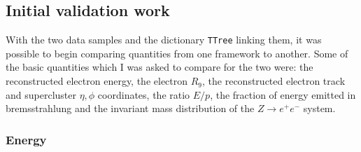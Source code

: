 \documentclass[10pt]{article}
\begin{document}
\subsection{Initial validation work}

With the two data samples and the dictionary \texttt{TTree} linking them, it was possible to begin comparing quantities from one framework to another. Some of the basic quantities which I was asked to compare for the two were: the reconstructed electron energy, the electron $R_9$, the reconstructed electron track and supercluster $\eta,\phi$ coordinates, the ratio $E/p$, the fraction of energy emitted in bremsstrahlung and the invariant mass distribution of the $Z \rightarrow e^+ e^-$ system.

\subsubsection{Energy}
\end{document}
